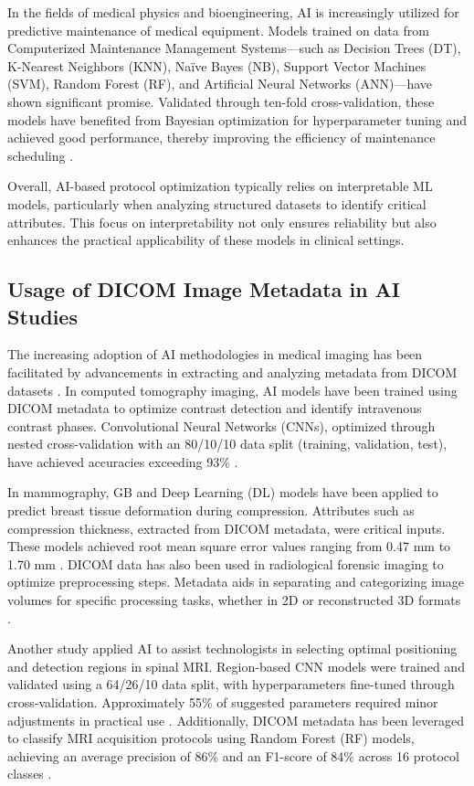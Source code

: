 In the fields of medical physics and bioengineering, AI is increasingly utilized for predictive maintenance of medical equipment. Models trained on data from Computerized Maintenance Management Systems—such as Decision Trees (DT), K-Nearest Neighbors (KNN), Naïve Bayes (NB), Support Vector Machines (SVM), Random Forest (RF), and Artificial Neural Networks (ANN)—have shown significant promise. Validated through ten-fold cross-validation, these models have benefited from Bayesian optimization for hyperparameter tuning and achieved good performance, thereby improving the efficiency of maintenance scheduling \cite{optMaint}.

Overall, AI-based protocol optimization typically relies on interpretable ML models, particularly when analyzing structured datasets to identify critical attributes. This focus on interpretability not only ensures reliability but also enhances the practical applicability of these models in clinical settings.


\subsection{Usage of DICOM Image Metadata in AI Studies}
The increasing adoption of AI methodologies in medical imaging has been facilitated by advancements in extracting and analyzing metadata from DICOM datasets \cite{dicomExtraction}. In computed tomography imaging, AI models have been trained using DICOM metadata to optimize contrast detection and identify intravenous contrast phases. Convolutional Neural Networks (CNNs), optimized through nested cross-validation with an 80/10/10 data split (training, validation, test), have achieved accuracies exceeding 93\% \cite{dicomCT}. 

In mammography, GB and Deep Learning (DL) models have been applied to predict breast tissue deformation during compression. Attributes such as compression thickness, extracted from DICOM metadata, were critical inputs. These models achieved root mean square error values ranging from 0.47 mm to 1.70 mm \cite{dicomMammo}. DICOM data has also been used in radiological forensic imaging to optimize preprocessing steps. Metadata aids in separating and categorizing image volumes for specific processing tasks, whether in 2D or reconstructed 3D formats \cite{dicomForensics}. 

Another study applied AI to assist technologists in selecting optimal positioning and detection regions in spinal MRI. Region-based CNN models were trained and validated using a 64/26/10 data split, with hyperparameters fine-tuned through cross-validation. Approximately 55\% of suggested parameters required minor adjustments in practical use \cite{dicomScanPrescription}. Additionally, DICOM metadata has been leveraged to classify MRI acquisition protocols using Random Forest (RF) models, achieving an average precision of 86\% and an F1-score of 84\% across 16 protocol classes \cite{dicomClassifier}.

